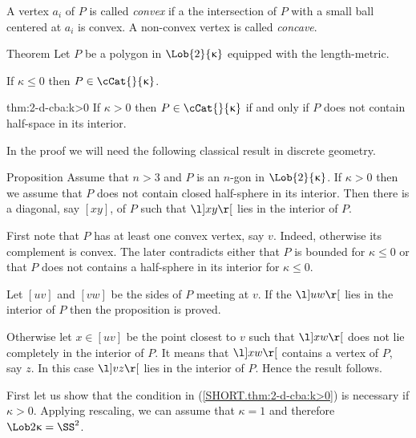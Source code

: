 A vertex $a_i$ of $P$ 
is called \emph{convex} if a the intersection of $P$ with a small ball centered at $a_i$ is convex.
A non-convex vertex is called \emph{concave}.


\begin{thm}{Theorem}\label{thm:2-d-cba}
Let $P$ be a polygon in $\Lob{2}{\kappa}$ equipped with the length-metric.
\begin{subthm}{}
If $\kappa\le 0$ then $P\in\cCat{}{\kappa}$.
\end{subthm}

\begin{subthm}{thm:2-d-cba:k>0}
If $\kappa>0$ then $P\in\cCat{}{\kappa}$ if  and only if $P$ does not contain half-space in its interior.
\end{subthm}
\end{thm}

In the proof we will need the following classical result in discrete geometry.

\begin{thm}{Proposition}\label{prop:diagonal}
Assume that $n>3$ 
and $P$ is an $n$-gon in $\Lob{2}{\kappa}$.
If $\kappa>0$ then we assume that $P$ does not contain closed half-sphere in its interior.
Then there is a  diagonal, say $[xy]$, of $P$ 
such that $\l]xy\r[$ lies in the interior of $P$.
\end{thm}

First note that $P$ has at least one convex vertex, say $v$.
Indeed, otherwise its complement is convex.
The later contradicts either
that $P$ is bounded for $\kappa\le  0$ 
or that $P$ does not contains a half-sphere in its interior for $\kappa\le  0$.

Let $[uv]$ and $[vw]$ be the sides of $P$ meeting at $v$.
If the $\l]uw\r[$ lies in the interior of $P$ 
then the proposition is proved.


Otherwise let $x\in[uv]$ be the point closest to $v$
such that $\l]xw\r[$ does not lie completely in the interior of $P$.
It means that $\l]xw\r[$ contains a vertex of $P$, 
say $z$.
In this case $\l]vz\r[$ lies in the interior of $P$.
Hence the result follows.
\qeds


First let us show that the condition in (\ref{SHORT.thm:2-d-cba:k>0}) is necessary if $\kappa>0$. 
Applying rescaling, we can assume that $\kappa=1$ and therefore $\Lob2\kappa=\SS^2$.

